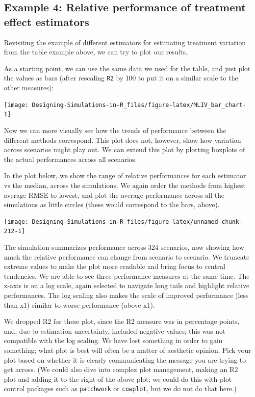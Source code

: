 \documentclass[
]{book}
\begin{document}
\subsection{Example 4: Relative performance of treatment effect estimators}\label{example-4-relative-performance-of-treatment-effect-estimators}

Revisiting the example of different estimators for estimating treatment variation from the table example above, we can try to plot our results.

As a starting point, we can use the same data we used for the table, and just plot the values as bars (after rescaling \texttt{R2} by 100 to put it on a similar scale to the other measures):

\begin{center}\texttt{[image: Designing-Simulations-in-R\_files/figure-latex/MLIV\_bar\_chart-1]} \end{center}

Now we can more visually see how the trends of performance between the different methods correspond.
This plot does not, however, show how variation across scenarios might play out.
We can extend this plot by plotting boxplots of the actual performances across all scenarios.

In the plot below, we show the range of relative performances for each estimator vs the median, across the simulations.
We again order the methods from highest average RMSE to lowest, and plot the average performance across all the simulations as little circles (these would correspond to the bars, above).

\begin{center}\texttt{[image: Designing-Simulations-in-R\_files/figure-latex/unnamed-chunk-212-1]} \end{center}

The simulation summarizes performance across 324 scenarios, now showing how much the relative performance can change from scenario to scenario.
We truncate extreme values to make the plot more readable and bring focus to central tendencies.
We are able to see three performance measures at the same time.
The x-axis is on a log scale, again selected to navigate long tails and highlight relative performances.
The log scaling also makes the scale of improved performance (less than x1) similar to worse performance (above x1).

We dropped R2 for these plot, since the R2 measure was in percentage points, and, due to estimation uncertainty, included negative values; this was not compatible with the log scaling.
We have lost something in order to gain something; what plot is best will often be a matter of aesthetic opinion.
Pick your plot based on whether it is clearly communicating the message you are trying to get across.
(We could also dive into complex plot management, making an R2 plot and adding it to the right of the above plot; we could do this with plot control packages such as \texttt{patchwork} or \texttt{cowplot}, but we do not do that here.)
\end{document}
